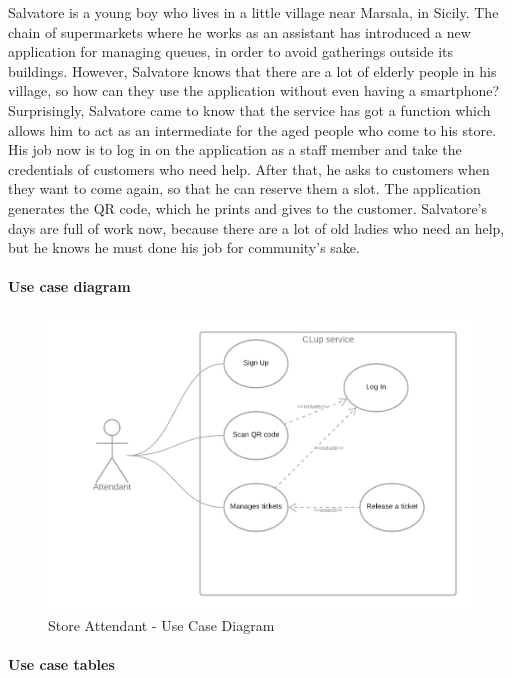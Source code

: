 \documentclass[table, 12pt]{article}
\begin{document}
Salvatore is a young boy who lives in a little village near Marsala, in Sicily. The chain of supermarkets where he works as an assistant has introduced a new application for managing queues, in order to avoid gatherings outside its buildings. However, Salvatore knows that there are a lot of elderly people in his village, so how can they use the application without even having a smartphone? Surprisingly, Salvatore came to know that the service has got a function which allows him to act as an intermediate for the aged people who come to his store. His job now is to log in on the application as a staff member and take the credentials of customers who need help. After that, he asks to customers when they want to come again, so that he can reserve them a slot. The application generates the QR code, which he prints and gives to the customer. Salvatore's days are full of work now, because there are a lot of old ladies who need an help, but he knows he must done his job for community's sake.

\paragraph{Use case diagram}
\begin{figure}[H]
    \begin{center}
        \includegraphics[width=\textwidth]{assets/use_case_diagram_assistant.png}
        \caption{Store Attendant - Use Case Diagram}
    \end{center}
\end{figure}




\paragraph{Use case tables}
\end{document}
